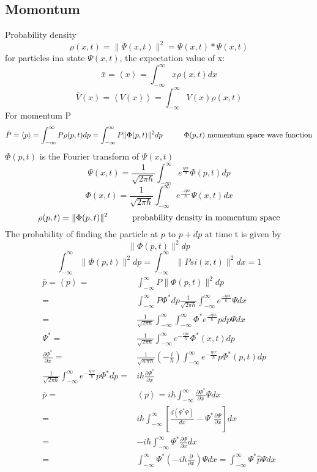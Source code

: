 \documentclass[12pt, a4paper]{article}
\newcommand{\tab}[1][1cm]{\hspace*{#1}}
\begin{document}
\subsection{Momontum}
Probability density $$\rho(x,t)=\|\Psi(x,t)\|^2=\Psi(x,t)*\Psi(x,t)$$
for particles ina state $\Psi(x,t)$, the expectation value of x: $$\bar x=\left<x\right>=\int_{-\infty}^{\infty}x\rho(x,t)dx$$
$$\bar V(x)=\left< V(x)\right>=\int_{-\infty}^{\infty}V(x)\rho(x,t)$$
For momentum P
$$\bar P =\left< p \right>=\int_{-\infty}^{\infty}P\rho(p,t)dp=\int_{-\infty}^{\infty}P\|\Phi(p,t)\|^2dp \tab \Phi(p,t) \text{ momentum space wave function}$$
$\Phi(p,t)$ is the Fourier transform of $\Psi(x,t)$
$$\Psi(x,t)=\frac{1}{\sqrt{2\pi\hbar}}\int_{-\infty}^{\infty}e^{\frac{ipx}{\hbar}}\Phi(p,t)dp$$
$$\Phi(x,t)=\frac{1}{\sqrt{2\pi\hbar}}\int_{-\infty}^{\infty}e^{\frac{-ipx}{\hbar}}\Psi(x,t)dx$$
$$\rho(p,t)=\|\Phi(p,t)\|^2 \tab \text{probability density in momentum space}$$
The probability of finding the particle at $p$ to $p +dp$ at time t is given by $$\|\Phi(p,t)\|^2dp$$ 
$$\int_{-\infty}^{\infty}\|\Phi(p,t)\|^2dp=\int_{-\infty}^{\infty}\|Psi(x,t)\|^2dx=1$$
\begin{align*}
\bar p=\left<p\right>=&\int_{-\infty}^{\infty}P\|\Phi(p,t)\|^2dp\\
=&\int_{-\infty}^{\infty}P\Phi^*dp\frac{1}{\sqrt{2\pi\hbar}}\int_{-\infty}^{\infty}e^{\frac{-ipx}{\hbar}}\Psi dx\\
=&\frac{1}{\sqrt{2\pi\hbar}}\int_{-\infty}^{\infty}\int_{-\infty}^{\infty}\Phi^*e^{\frac{-ipx}{\hbar}}pdp\Psi dx\\
\Psi^*=&\frac{1}{\sqrt{2\pi\hbar}}\int_{-\infty}^{\infty}e^{-\frac{ipx}{\hbar}}\Phi^*(x,t)dp\\
\frac{\partial \Psi^*}{\partial x}=&\frac{1}{\sqrt{w\pi\hbar}}(-\frac{i}{\hbar})\int_{-\infty}^{\infty}e^{-\frac{ipx}{\hbar}}p\Phi^*(p,t)dp\\
\frac{1}{\sqrt{2\pi\hbar}}\int_{-\infty}^{\infty}e^{-\frac{ipx}{\hbar}}p\Phi^*dp=&i\hbar \frac{\partial \Psi^*}{\partial x}\\
\bar p=&\left<p\right>=i\hbar \int_{-\infty}^{\infty} \frac{\partial \Psi^*}{\partial x}\Psi dx\\
=&i\hbar \int_{-\infty}^{\infty} \left[ \frac{d(\Psi^* \Psi)}{dx}-\Psi^*\frac{\partial \Psi}{\partial x} \right] dx\\
=&-i\hbar \int_{-\infty}^{\infty} \Psi^* \frac{\partial \Psi}{\partial x}dx\\
=&\int_{-\infty}^{\infty}\Psi ^*(-i\hbar \frac{\partial}{\partial	x})\Psi dx=\int_{-\infty}^{\infty}\Psi^* \hat p \Psi dx
\end{align*}
\end{document}
